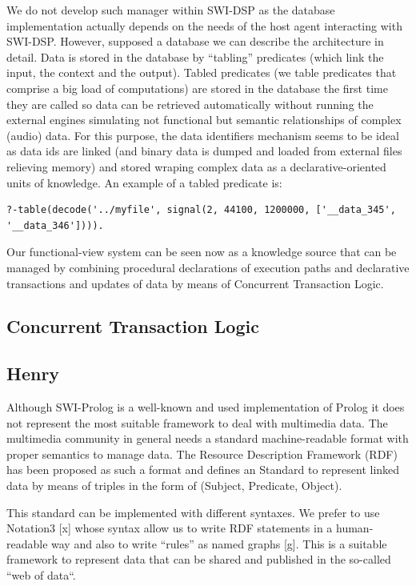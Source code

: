 \documentclass[runningheads]{llncs}
\begin{document}
We do not develop such manager within SWI-DSP as the database implementation actually depends on the needs of the host agent interacting with SWI-DSP. However, supposed a database we can describe the architecture in detail. Data is stored in the database by ``tabling'' predicates (which link the input, the context and the output). Tabled predicates (we table predicates that comprise a big load of computations) are stored in the database the first time they are called so data can be retrieved automatically without running the external engines simulating not functional but semantic relationships of complex (audio) data. For this purpose, the data identifiers mechanism seems to be ideal as data ids are linked (and binary data is dumped and loaded from external files relieving memory) and stored wraping complex data as a declarative-oriented units of knowledge. An example of a tabled predicate is:

\begin{verbatim}
?-table(decode('../myfile', signal(2, 44100, 1200000, ['__data_345', '__data_346']))).
\end{verbatim}

Our functional-view system can be seen now as a knowledge source that can be managed by combining procedural declarations of execution paths and declarative transactions and updates of data by means of Concurrent Transaction Logic.

\subsection{Concurrent Transaction Logic}\label{sec:ctl}



\subsection{Henry}\label{subsec:henry}

Although SWI-Prolog is a well-known and used implementation of Prolog it does not represent the most suitable framework to deal with multimedia data. The multimedia community in general needs a standard machine-readable format with proper semantics to manage data. The Resource Description Framework (RDF) has been proposed as such a format and defines an Standard to represent linked data by means of triples in the form of (Subject, Predicate, Object).

This standard can be implemented with different syntaxes. We prefer to use Notation3 [x] whose syntax allow us to write RDF statements in a human-readable way and also to write ``rules'' as named graphs [g]. This is a suitable framework to represent data that can be shared and published in the so-called ``web of data``.
\end{document}
